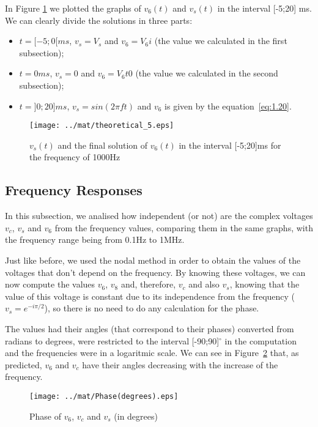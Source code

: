 In Figure \ref{fig:mat4} we plotted the graphs of $v_6(t)$ and $v_s(t)$ in the interval [-5;20] ms. We can clearly divide the solutions in three parts:
\begin{itemize}
\item $t=[-5;0[ ms$, $v_s = V_s$ and $v_6 = V_6i$ (the value we calculated in the first subsection);
\item $t=0 ms$, $v_s = 0$ and $v_6 = V_6t0$ (the value we calculated in the second subsection);
\item $t=]0;20] ms$, $v_s = sin(2\pi f t)$ and $v_6$ is given by the equation~\ref{eq:1.20}.
\end{itemize}

\begin{figure}[H] \centering
\texttt{[image: ../mat/theoretical\_5.eps]}
\caption{$v_s(t)$ and the final solution of $v_6(t)$ in the interval [-5;20]ms for the frequency of 1000Hz}
\label{fig:mat4}
\end{figure}


\subsection{Frequency Responses}
In this subsection, we analised how independent (or not) are the complex voltages $v_c$, $v_s$ and $v_6$ from the frequency values, comparing them in the same graphs, with the frequency range being from 0.1Hz to 1MHz. 

Just like before, we used the nodal method in order to obtain the values of the voltages that don't depend on the frequency. By knowing these voltages, we can now compute the values $v_6$, $v_8$ and, therefore, $v_c$ and also $v_s$, knowing that the value of this voltage is constant due to its independence from the frequency ($v_s = e^{-i\pi/2}$), so there is no need to do any calculation for the phase.

The values had their angles (that correspond to their phases) converted from radians to degrees, were restricted to the interval [-90;90]$^{\circ}$ in the computation and the frequencies were in a logaritmic scale. We can see in Figure~\ref{fig:mat5db} that, as predicted, $v_6$ and $v_c$ have their angles decreasing with the increase of the frequency.

\begin{figure}[H] \centering
\texttt{[image: ../mat/Phase(degrees).eps]}
\caption{Phase of $v_6$, $v_c$ and $v_s$ (in degrees)}
\label{fig:mat5db}
\end{figure}

